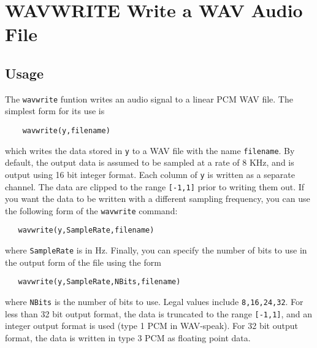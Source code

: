 \section{WAVWRITE Write a WAV Audio File}

\subsection{Usage}

The \verb|wavwrite| funtion writes an audio signal to a linear PCM WAV
file.  The simplest form for its use is
\begin{verbatim}
    wavwrite(y,filename)
\end{verbatim}
which writes the data stored in \verb|y| to a WAV file with the name
\verb|filename|.  By default, the output data is assumed to be sampled at a
rate of 8 KHz, and is output using 16 bit integer format.  Each column
of \verb|y| is written as a separate channel.  The data are clipped to the
range \verb|[-1,1]| prior to writing them out.  If you want the data to be
written with a different sampling frequency, you can use the following
form of the \verb|wavwrite| command:
\begin{verbatim}
   wavwrite(y,SampleRate,filename)
\end{verbatim}
where \verb|SampleRate| is in Hz.  Finally, you can specify the number of
bits to use in the output form of the file using the form
\begin{verbatim}
   wavwrite(y,SampleRate,NBits,filename)
\end{verbatim}
where \verb|NBits| is the number of bits to use.  Legal values include
\verb|8,16,24,32|.  For less than 32 bit output format, the data is
truncated to the range \verb|[-1,1]|, and an integer output format is used
(type 1 PCM in WAV-speak).  For 32 bit output format, the data is
written in type 3 PCM as floating point data.
